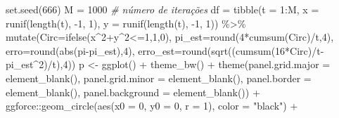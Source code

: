 \documentclass[
]{book}
\newenvironment{Shaded}{\begin{snugshade}}{\end{snugshade}}
\newcommand{\AttributeTok}[1]{\textcolor[rgb]{0.77,0.63,0.00}{#1}}
\newcommand{\CommentTok}[1]{\textcolor[rgb]{0.56,0.35,0.01}{\textit{#1}}}
\newcommand{\DecValTok}[1]{\textcolor[rgb]{0.00,0.00,0.81}{#1}}
\newcommand{\FunctionTok}[1]{\textcolor[rgb]{0.00,0.00,0.00}{#1}}
\newcommand{\NormalTok}[1]{#1}
\newcommand{\OtherTok}[1]{\textcolor[rgb]{0.56,0.35,0.01}{#1}}
\newcommand{\SpecialCharTok}[1]{\textcolor[rgb]{0.00,0.00,0.00}{#1}}
\newcommand{\StringTok}[1]{\textcolor[rgb]{0.31,0.60,0.02}{#1}}
\begin{document}
\begin{Shaded}
\begin{Highlighting}[]
\FunctionTok{set.seed}\NormalTok{(}\DecValTok{666}\NormalTok{)}
\NormalTok{M }\OtherTok{=} \DecValTok{1000} \CommentTok{\# número de iterações}
\NormalTok{df }\OtherTok{=} \FunctionTok{tibble}\NormalTok{(}\AttributeTok{t =} \DecValTok{1}\SpecialCharTok{:}\NormalTok{M, }\AttributeTok{x =} \FunctionTok{runif}\NormalTok{(}\FunctionTok{length}\NormalTok{(t), }\SpecialCharTok{{-}}\DecValTok{1}\NormalTok{, }\DecValTok{1}\NormalTok{), }
            \AttributeTok{y =} \FunctionTok{runif}\NormalTok{(}\FunctionTok{length}\NormalTok{(t), }\SpecialCharTok{{-}}\DecValTok{1}\NormalTok{, }\DecValTok{1}\NormalTok{)) }\SpecialCharTok{\%\textgreater{}\%} 
  \FunctionTok{mutate}\NormalTok{(}\AttributeTok{Circ=}\FunctionTok{ifelse}\NormalTok{(x}\SpecialCharTok{\^{}}\DecValTok{2}\SpecialCharTok{+}\NormalTok{y}\SpecialCharTok{\^{}}\DecValTok{2}\SpecialCharTok{\textless{}=}\DecValTok{1}\NormalTok{,}\DecValTok{1}\NormalTok{,}\DecValTok{0}\NormalTok{), }
         \AttributeTok{pi\_est=}\FunctionTok{round}\NormalTok{(}\DecValTok{4}\SpecialCharTok{*}\FunctionTok{cumsum}\NormalTok{(Circ)}\SpecialCharTok{/}\NormalTok{t,}\DecValTok{4}\NormalTok{),}
         \AttributeTok{erro=}\FunctionTok{round}\NormalTok{(}\FunctionTok{abs}\NormalTok{(pi}\SpecialCharTok{{-}}\NormalTok{pi\_est),}\DecValTok{4}\NormalTok{),}
         \AttributeTok{erro\_est=}\FunctionTok{round}\NormalTok{(}\FunctionTok{sqrt}\NormalTok{((}\FunctionTok{cumsum}\NormalTok{(}\DecValTok{16}\SpecialCharTok{*}\NormalTok{Circ)}\SpecialCharTok{/}\NormalTok{t}\SpecialCharTok{{-}}\NormalTok{pi\_est}\SpecialCharTok{\^{}}\DecValTok{2}\NormalTok{)}\SpecialCharTok{/}\NormalTok{t),}\DecValTok{4}\NormalTok{))}
\NormalTok{p }\OtherTok{\textless{}{-}} \FunctionTok{ggplot}\NormalTok{() }\SpecialCharTok{+} \FunctionTok{theme\_bw}\NormalTok{() }\SpecialCharTok{+} 
        \FunctionTok{theme}\NormalTok{(}\AttributeTok{panel.grid.major =} \FunctionTok{element\_blank}\NormalTok{(),}
            \AttributeTok{panel.grid.minor =} \FunctionTok{element\_blank}\NormalTok{(),}
            \AttributeTok{panel.border =} \FunctionTok{element\_blank}\NormalTok{(),}
            \AttributeTok{panel.background =} \FunctionTok{element\_blank}\NormalTok{()) }\SpecialCharTok{+}
\NormalTok{        ggforce}\SpecialCharTok{::}\FunctionTok{geom\_circle}\NormalTok{(}\FunctionTok{aes}\NormalTok{(}\AttributeTok{x0 =} \DecValTok{0}\NormalTok{, }\AttributeTok{y0 =} \DecValTok{0}\NormalTok{, }\AttributeTok{r =} \DecValTok{1}\NormalTok{), }\AttributeTok{color =} \StringTok{"black"}\NormalTok{) }\SpecialCharTok{+}

\end{Highlighting}
\end{Shaded}
\end{document}

